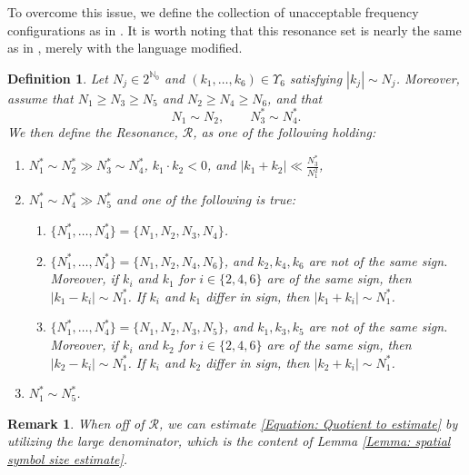 \documentclass[12pt, letterpaper]{amsart}
\newtheorem{remark}{Remark}
\newtheorem{definition}{Definition}
\begin{document}
To overcome this issue, we define the collection of unacceptable frequency configurations as in \cite{schippa2024improved}. It is worth noting that this resonance set is nearly the same as in \cite{li2011global}, merely with the language modified.
\begin{definition}\label{Definition: Resonant Set}
    Let $N_j\in2^{\mathbb{N}_0}$ and $(k_1,\dots,k_6)\in\Upsilon_6$ satisfying $|k_j|\sim N_j$. Moreover, assume that $N_1\geq N_3\geq N_5$ and $N_2\geq N_4\geq N_6$, and that
    \[
    N_1\sim N_2,\quad\quad N_3^*\sim N_4^*.
    \]
    We then define the Resonance, $\mathcal{R}$, as one of the following holding:
    \begin{enumerate}[label = (\roman*)]
        \item $N_1^*\sim N_2^*\gg N_3^*\sim N_4^*$, $k_1\cdot k_2 < 0$, and $|k_1+k_2|\ll\frac{N_3^*}{N_1^2}$,
        \item $N_1^*\sim N_4^*\gg N_5^*$ and one of the following is true:
        \begin{enumerate}
            \item $\{N_1^*,\dots,N_4^*\} = \{N_1,N_2,N_3,N_4\}$.
            \item $\{N_1^*,\dots,N_4^*\} = \{N_1,N_2,N_4,N_6\}$, and $k_2,k_4,k_6$ are not of the same sign. Moreover, if $k_i$ and $k_1$ for $i\in\{2,4,6\}$ are of the same sign, then $|k_1-k_i|\sim N_1^*$. If $k_i$ and $k_1$ differ in sign, then $|k_1+k_i|\sim N_1^*$.
            \item $\{N_1^*,\dots,N_4^*\} = \{N_1,N_2,N_3,N_5\}$, and $k_1,k_3,k_5$ are not of the same sign. Moreover, if $k_i$ and $k_2$ for $i\in\{2,4,6\}$ are of the same sign, then $|k_2-k_i|\sim N_1^*$. If $k_i$ and $k_2$ differ in sign, then $|k_2+k_i|\sim N_1^*$.
        \end{enumerate}
        \item $N_1^*\sim N_5^*$.
    \end{enumerate}
\end{definition}
\begin{remark}
    When off of $\mathcal{R}$, we can estimate \eqref{Equation: Quotient to estimate} by utilizing the large denominator, which is the content of Lemma \ref{Lemma: spatial symbol size estimate}.
\end{remark}
\end{document}
